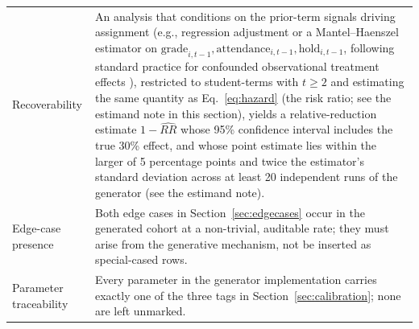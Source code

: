 \documentclass[11pt]{article}
\begin{document}
\begin{table}[t]
\begin{tabular}{@{}p{}p{}@{}}
\addlinespace
Recoverability & An analysis that conditions on the prior-term signals driving assignment (e.g., regression adjustment or a Mantel--Haenszel estimator on $\text{grade}_{i,t-1}, \text{attendance}_{i,t-1}, \text{hold}_{i,t-1}$, following standard practice for confounded observational treatment effects \citep{gelman2020ros}), restricted to student-terms with $t \ge 2$ and estimating the same quantity as Eq.~\ref{eq:hazard} (the risk ratio; see the estimand note in this section), yields a relative-reduction estimate $1-\widehat{RR}$ whose 95\% confidence interval includes the true 30\% effect, and whose point estimate lies within the larger of 5 percentage points and twice the estimator's standard deviation across at least 20 independent runs of the generator (see the estimand note). \\
\addlinespace
Edge-case presence & Both edge cases in Section~\ref{sec:edgecases} occur in the generated cohort at a non-trivial, auditable rate; they must arise from the generative mechanism, not be inserted as special-cased rows. \\
\addlinespace
Parameter traceability & Every parameter in the generator implementation carries exactly one of the three tags in Section~\ref{sec:calibration}; none are left unmarked. \\
\bottomrule
\end{tabular}
\end{table}
\end{document}
